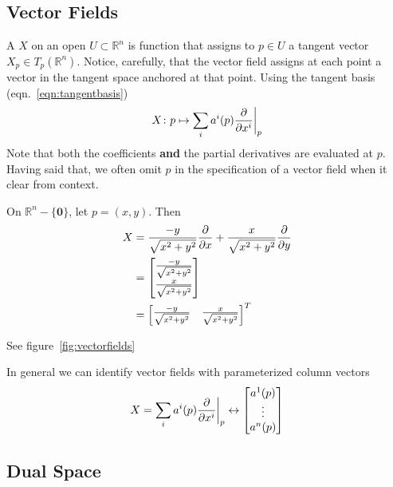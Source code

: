 \subsection{Vector Fields}

A  \(X\) on an open \(U \subset \mathbb{R}^n\) is function that assigns to \(p \in U\) a tangent vector \(X_p \in T_p(\mathbb{R}^n)\).
%
Notice, carefully, that the vector field assigns at each point a vector in the tangent space anchored at that point.
%
Using the tangent basis (eqn.~\eqref{eqn:tangentbasis})
%
\begin{equation}
    X\colon p \mapsto \sum_i a^i(p) \evalat[\bigg]{\pdv{}{x^i}}{p}
\end{equation}
%
Note that both the coefficients \textbf{and} the partial derivatives are evaluated at \(p\).
%
Having said that, we often omit \(p\) in the specification of a vector field when it clear from context.
%
\begin{example}{}{}
    On \(\mathbb{R}^n - \{\bm{0}\}\), let \(p = (x,y)\). Then
    \begin{align*}
        X & = \frac{-y}{\sqrt{x^2+y^2}} \pdv{}{x} + \frac{x}{\sqrt{x^2+y^2}} \pdv{}{y} \\
          & = \begin{bmatrix}
            \frac{-y}{\sqrt{x^2+y^2}} \\ \frac{x}{\sqrt{x^2+y^2}}
        \end{bmatrix}                                               \\
          & = \begin{bmatrix}
            \frac{-y}{\sqrt{x^2+y^2}} & \frac{x}{\sqrt{x^2+y^2}}
        \end{bmatrix}^T
    \end{align*}
\end{example}
%
See figure~\ref{fig:vectorfields}

In general we can identify vector fields with parameterized column vectors
%
\begin{equation}
    X = \sum_i a^i(p) \evalat[\bigg]{\pdv{}{x^i}}{p}
    \leftrightarrow
    \begin{bmatrix}
        a^1(p) \\ \vdots \\ a^n(p)
    \end{bmatrix}
\end{equation}

\subsection{Dual Space}


